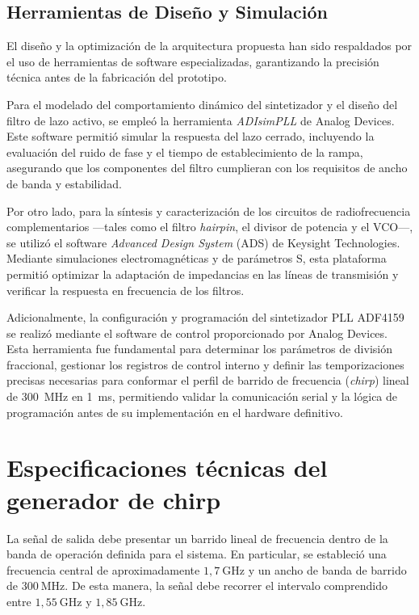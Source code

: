 \subsection{Herramientas de Diseño y Simulación}
El diseño y la optimización de la arquitectura propuesta han sido respaldados por el uso de herramientas de software especializadas, garantizando la precisión técnica antes de la fabricación del prototipo.

Para el modelado del comportamiento dinámico del sintetizador y el diseño del filtro de lazo activo, se empleó la herramienta \textit{ADIsimPLL} de Analog Devices. Este software permitió simular la respuesta del lazo cerrado, incluyendo la evaluación del ruido de fase y el tiempo de establecimiento de la rampa, asegurando que los componentes del filtro cumplieran con los requisitos de ancho de banda y estabilidad.

Por otro lado, para la síntesis y caracterización de los circuitos de radiofrecuencia complementarios —tales como el filtro \textit{hairpin}, el divisor de potencia y el VCO—, se utilizó el software \textit{Advanced Design System} (ADS) de Keysight Technologies. Mediante simulaciones electromagnéticas y de parámetros S, esta plataforma permitió optimizar la adaptación de impedancias en las líneas de transmisión y verificar la respuesta en frecuencia de los filtros.

Adicionalmente, la configuración y programación del sintetizador PLL ADF4159 se realizó mediante el software de control proporcionado por Analog Devices. Esta herramienta fue fundamental para determinar los parámetros de división fraccional, gestionar los registros de control interno y definir las temporizaciones precisas necesarias para conformar el perfil de barrido de frecuencia (\textit{chirp}) lineal de 300~MHz en 1~ms, permitiendo validar la comunicación serial y la lógica de programación antes de su implementación en el hardware definitivo.

\section{Especificaciones técnicas del generador de chirp}

La señal de salida debe presentar un barrido lineal de frecuencia dentro de la banda de operación definida para el sistema. En particular, se estableció una frecuencia central de aproximadamente $1{,}7~\mathrm{GHz}$ y un ancho de banda de barrido de $300~\mathrm{MHz}$. De esta manera, la señal debe recorrer el intervalo comprendido entre $1{,}55~\mathrm{GHz}$ y $1{,}85~\mathrm{GHz}$.

